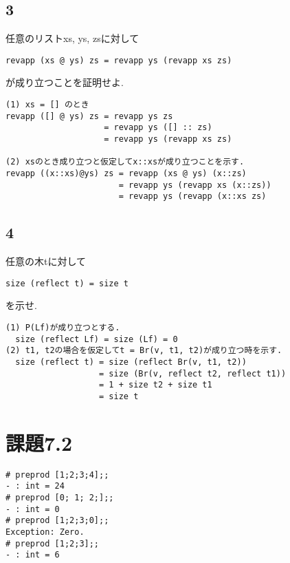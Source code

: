 \documentclass[11pt,a4j]{jarticle}
\begin{document}
\subsection*{3}
任意のリストxs, ys, zsに対して
\begin{verbatim}
revapp (xs @ ys) zs = revapp ys (revapp xs zs)    
\end{verbatim}
が成り立つことを証明せよ.
\begin{screen}
\begin{verbatim}
(1) xs = [] のとき
revapp ([] @ ys) zs = revapp ys zs
                    = revapp ys ([] :: zs)
                    = revapp ys (revapp xs zs)

(2) xsのとき成り立つと仮定してx::xsが成り立つことを示す.
revapp ((x::xs)@ys) zs = revapp (xs @ ys) (x::zs)
                       = revapp ys (revapp xs (x::zs))
                       = revapp ys (revapp (x::xs zs)   
\end{verbatim}
\end{screen}
\subsection*{4}
任意の木tに対して
\begin{verbatim}
size (reflect t) = size t
\end{verbatim}
を示せ.
\begin{screen}
\begin{verbatim}
(1) P(Lf)が成り立つとする.
  size (reflect Lf) = size (Lf) = 0
(2) t1, t2の場合を仮定してt = Br(v, t1, t2)が成り立つ時を示す.
  size (reflect t) = size (reflect Br(v, t1, t2))
                   = size (Br(v, reflect t2, reflect t1))
                   = 1 + size t2 + size t1
                   = size t
\end{verbatim} 
\end{screen}
\section*{課題7.2}

\begin{lstlisting}
# preprod [1;2;3;4];;
- : int = 24
# preprod [0; 1; 2;];;
- : int = 0
# preprod [1;2;3;0];;
Exception: Zero.
# preprod [1;2;3];;
- : int = 6 
\end{lstlisting}
\end{document}

